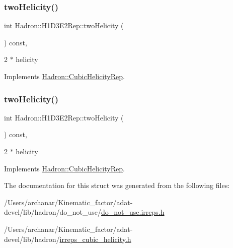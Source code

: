 \subsubsection{\texorpdfstring{twoHelicity()}{twoHelicity()}\hspace{0.1cm}{\footnotesize\ttfamily [2/3]}}
{\footnotesize\ttfamily int Hadron\+::\+H1\+D3\+E2\+Rep\+::two\+Helicity (\begin{DoxyParamCaption}{ }\end{DoxyParamCaption}) const\hspace{0.3cm}{\ttfamily [inline]}, {\ttfamily [virtual]}}

2 $\ast$ helicity 

Implements \mbox{\hyperlink{structHadron_1_1CubicHelicityRep_af507aa56fc2747eacc8cb6c96db31ecc}{Hadron\+::\+Cubic\+Helicity\+Rep}}.

\mbox{\label{structHadron_1_1H1D3E2Rep_abc2ae293f19603d5c8d08fc6f7fa7830}} 
\subsubsection{\texorpdfstring{twoHelicity()}{twoHelicity()}\hspace{0.1cm}{\footnotesize\ttfamily [3/3]}}
{\footnotesize\ttfamily int Hadron\+::\+H1\+D3\+E2\+Rep\+::two\+Helicity (\begin{DoxyParamCaption}{ }\end{DoxyParamCaption}) const\hspace{0.3cm}{\ttfamily [inline]}, {\ttfamily [virtual]}}

2 $\ast$ helicity 

Implements \mbox{\hyperlink{structHadron_1_1CubicHelicityRep_af507aa56fc2747eacc8cb6c96db31ecc}{Hadron\+::\+Cubic\+Helicity\+Rep}}.



The documentation for this struct was generated from the following files\+:\begin{DoxyCompactItemize}
\item 
/\+Users/archanar/\+Kinematic\+\_\+factor/adat-\/devel/lib/hadron/do\+\_\+not\+\_\+use/\mbox{\hyperlink{adat-devel_2lib_2hadron_2do__not__use_2do__not__use_8irreps_8h}{do\+\_\+not\+\_\+use.\+irreps.\+h}}\item 
/\+Users/archanar/\+Kinematic\+\_\+factor/adat-\/devel/lib/hadron/\mbox{\hyperlink{adat-devel_2lib_2hadron_2irreps__cubic__helicity_8h}{irreps\+\_\+cubic\+\_\+helicity.\+h}}\end{DoxyCompactItemize}
